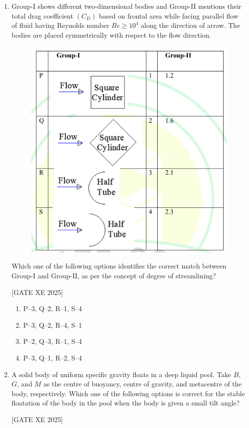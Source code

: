 \documentclass[journal,12pt,onecolumn]{IEEEtran}
\theoremstyle{remark}
\begin{document}
\begin{enumerate}
\item Group-I shows different two-dimensional bodies and Group-II mentions their total drag coefficient $(C_D)$ based on frontal area while facing parallel flow of fluid having Reynolds number $Re\ge 10^4$ along the direction of arrow. The bodies are placed symmetrically with respect to the flow direction. \\
\begin{figure}[H]
    \centering
    \includegraphics[width=0.5\columnwidth]{figs/fig7.png}
    \caption{}
    \label{fig:placeholder}
\end{figure}

Which one of the following options identifies the correct match between Group-I and Group-II, as per the concept of degree of streamlining? \label{q:32}


\hfill[GATE XE 2025]

\begin{multicols}{2}
\begin{enumerate}
\item P–3, Q–2, R–1, S–4
\item P–3, Q–2, R–4, S–1
\item P–2, Q–3, R–1, S–4
\item P–3, Q–1, R–2, S–4
\end{enumerate}
\end{multicols}


\item A solid body of uniform specific gravity floats in a deep liquid pool. Take $B$, $G$, and $M$ as the centre of buoyancy, centre of gravity, and metacentre of the body, respectively. Which one of the following options is correct for the stable floatation of the body in the pool when the body is given a small tilt angle? \label{q:33}

\hfill[GATE XE 2025]


\end{enumerate}
\end{document}
